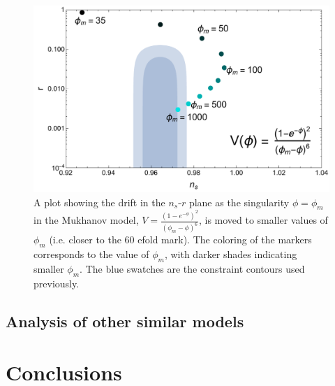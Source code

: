\documentclass[a4paper,11pt]{article}
\def\nsr{$n_s$-$r$ }
\begin{document}
\begin{figure}[h!]
	\centering
	\includegraphics[width=\textwidth]{figures/Mukhanov6.pdf}
	\caption[Drift in \nsr plane for Mukhanov model as the singularity moves to smaller $\phi$.]{A plot showing the drift in the \nsr plane as the singularity $\phi=\phi_m$ in the Mukhanov model, $V=\tfrac{(1-e^{-\phi})^2}{(\phi_m-\phi)^6}$, is moved to smaller values of $\phi_m$ (i.e. closer to the 60 efold mark). The coloring of the markers corresponds to the value of $\phi_m$, with darker shades indicating smaller $\phi_m$. The blue swatches are the \citet{Planck2015} constraint contours used previously.}
	\label{fig:Mukhanov6_drift}
\end{figure}

\subsection{Analysis of other similar models}

\FloatBarrier
\newpage
\section{Conclusions}
\end{document}

